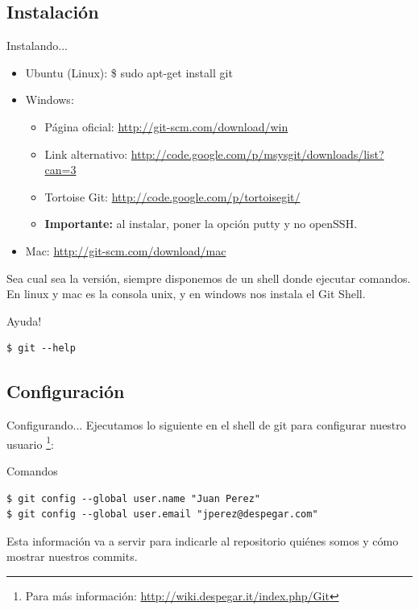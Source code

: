\documentclass{beamer}
\begin{document}
\subsection{Instalación}
\begin{frame}[fragile]{Instalando...} 
  \begin{block}{}
      \begin{itemize}
      \item Ubuntu (Linux): \$ sudo apt-get install git \pause
	\item	 Windows: \begin{itemize}
			\item Página oficial: \url{http://git-scm.com/download/win} 
			\item Link alternativo: \url{http://code.google.com/p/msysgit/downloads/list?can=3}
			\item Tortoise Git: \url{http://code.google.com/p/tortoisegit/}
			\item \textbf{Importante:} al instalar, poner la opción putty y no openSSH.
		      \end{itemize} \pause
      \item Mac: \url{http://git-scm.com/download/mac} \pause
      \end{itemize}
  
    Sea cual sea la versión, siempre disponemos de un shell donde ejecutar comandos. En linux y mac es la consola unix,
    y en windows nos instala el Git Shell. 
  \end{block}
  \pause
  \begin{block}{Ayuda!}
    \begin{verbatim}
$ git --help
     \end{verbatim}
  \end{block}
  
\end{frame}
\subsection{Configuración}
\begin{frame}[fragile]{Configurando...}
  Ejecutamos lo siguiente en el shell de git para configurar nuestro usuario \footnote{Para más información: \url{http://wiki.despegar.it/index.php/Git}}:
  
  \begin{block}{Comandos}
  \begin{verbatim}
$ git config --global user.name "Juan Perez"
$ git config --global user.email "jperez@despegar.com"
  \end{verbatim}
  \end{block}

  Esta información va a servir para indicarle al repositorio quiénes somos y cómo mostrar nuestros commits.
  
\end{frame}
\end{document}
